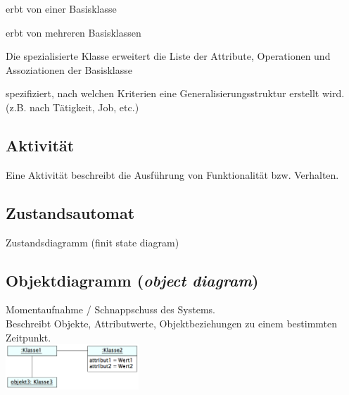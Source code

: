   \begin{description}
  	\parbox{8cm}{
    \item[Einfachvererbung]
      erbt von einer Basisklasse
    \item[Mehrfachvererbung]
      erbt von mehreren Basisklassen
    \item[Generalisierung] 
      Die spezialisierte Klasse erweitert die Liste der
      Attribute, Operationen und Assoziationen der Basisklasse
    \item[Generalisierungsmenge] 
      spezifiziert, nach welchen Kriterien eine Generalisierungsstruktur erstellt wird.
      (z.B. nach Tätigkeit, Job, etc.)}
  \parbox{9cm}{
  }
  \end{description}

 \begin{multicols}{2}
	\subsection{Aktivität }
  		Eine Aktivität beschreibt die Ausführung von Funktionalität bzw. Verhalten.

	\subsection{Zustandsautomat }
 		 Zustandsdiagramm (finit state diagram)
 \end{multicols}
 
\subsection{Objektdiagramm (\textit{object diagram}) }
	\begin{multicols}{2}
		Momentaufnahme / Schnappschuss des Systems. \\
		Beschreibt Objekte, Attributwerte, Objektbeziehungen zu einem bestimmten Zeitpunkt. \\
	\columnbreak
		\includegraphics[width=5cm]{./bilder/objektdiagramm}
	\end{multicols}



